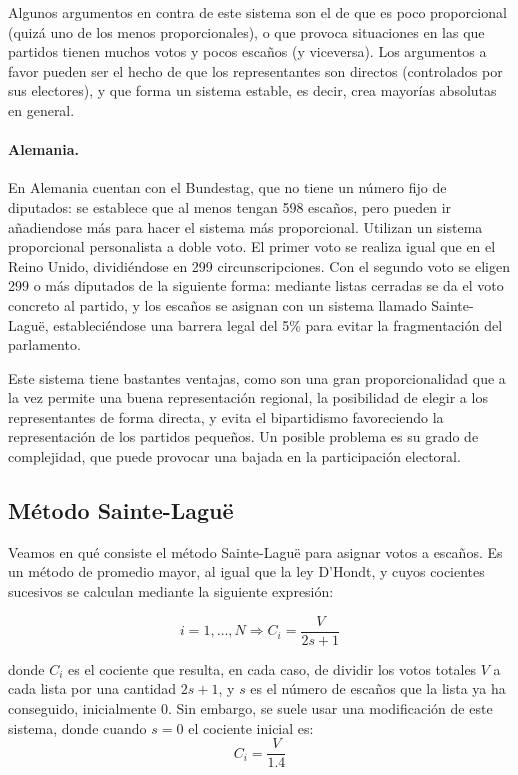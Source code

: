 \documentclass[11pt]{article}
\begin{document}
Algunos argumentos en contra de este sistema son el de que es poco proporcional (quizá uno de los menos proporcionales), o que provoca situaciones en las que partidos tienen muchos votos y pocos escaños (y viceversa). Los argumentos a favor pueden ser el hecho de que los representantes son directos (controlados por sus electores), y que forma un sistema estable, es decir, crea mayorías absolutas en general.

\paragraph{Alemania.}

En Alemania cuentan con el Bundestag, que no tiene un número fijo de diputados: se establece que al menos tengan 598 escaños, pero pueden ir añadiendose más para hacer el sistema más proporcional. Utilizan un sistema proporcional personalista a doble voto. El primer voto se realiza igual que en el Reino Unido, dividiéndose en 299 circunscripciones. Con el segundo voto se eligen 299 o más diputados de la siguiente forma: mediante listas cerradas se da el voto concreto al partido, y los escaños se asignan con un sistema llamado Sainte-Laguë, estableciéndose una barrera legal del 5\% para evitar la fragmentación del parlamento.

Este sistema tiene bastantes ventajas, como son una gran proporcionalidad que a la vez permite una buena representación regional, la posibilidad de elegir a los representantes de forma directa, y evita el bipartidismo favoreciendo la representación de los partidos pequeños. Un posible problema es su grado de complejidad, que puede provocar una bajada en la participación electoral.

\subsection{Método Sainte-Laguë}

Veamos en qué consiste el método Sainte-Laguë para asignar votos a escaños. Es un método de promedio mayor, al igual que la ley D'Hondt, y cuyos cocientes sucesivos se calculan mediante la siguiente expresión:

$$ i = 1,\ldots,N \Rightarrow C_i = \dfrac{V}{2s + 1}$$
	
	donde $C_i$ es el cociente que resulta, en cada caso, de dividir los votos totales $V$ a cada lista por una cantidad $2s + 1$, y $s$ es el número de escaños que la lista ya ha conseguido, inicialmente 0. Sin embargo, se suele usar una modificación de este sistema, donde cuando $s=0$ el cociente inicial es: $$ C_i = \frac{V}{1.4} $$
\end{document}
